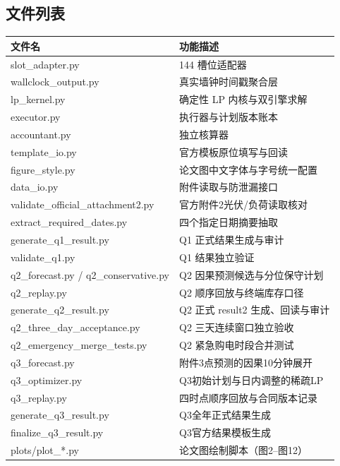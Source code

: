 \documentclass[withoutpreface,bwprint]{cumcmthesis}
\begin{document}
\begin{appendices}
	
	
	
	
\section{文件列表}
\begin{table}[H]
\centering
\begin{tabularx}{\textwidth}{LL}
\toprule
文件名   & 功能描述 \\
\midrule
slot\_adapter.py & 144 槽位适配器 \\
wallclock\_output.py & 真实墙钟时间戳聚合层 \\
lp\_kernel.py & 确定性 LP 内核与双引擎求解 \\
executor.py & 执行器与计划版本账本 \\
accountant.py & 独立核算器 \\
template\_io.py & 官方模板原位填写与回读 \\
figure\_style.py & 论文图中文字体与字号统一配置 \\
data\_io.py & 附件读取与防泄漏接口 \\
validate\_official\_attachment2.py & 官方附件2光伏/负荷读取核对 \\
extract\_required\_dates.py & 四个指定日期摘要抽取 \\
generate\_q1\_result.py & Q1 正式结果生成与审计 \\
validate\_q1.py & Q1 结果独立验证 \\
q2\_forecast.py / q2\_conservative.py & Q2 因果预测候选与分位保守计划 \\
q2\_replay.py & Q2 顺序回放与终端库存口径 \\
generate\_q2\_result.py & Q2 正式 result2 生成、回读与审计 \\
q2\_three\_day\_acceptance.py & Q2 三天连续窗口独立验收 \\
q2\_emergency\_merge\_tests.py & Q2 紧急购电时段合并测试 \\
q3\_forecast.py & 附件3点预测的因果10分钟展开 \\
q3\_optimizer.py & Q3初始计划与日内调整的稀疏LP \\
q3\_replay.py & 四时点顺序回放与合同版本记录 \\
generate\_q3\_result.py & Q3全年正式结果生成 \\
finalize\_q3\_result.py & Q3官方结果模板生成 \\
plots/plot\_*.py & 论文图绘制脚本（图2--图12） \\

\end{tabularx}
\end{table}
\end{appendices}
\end{document}
